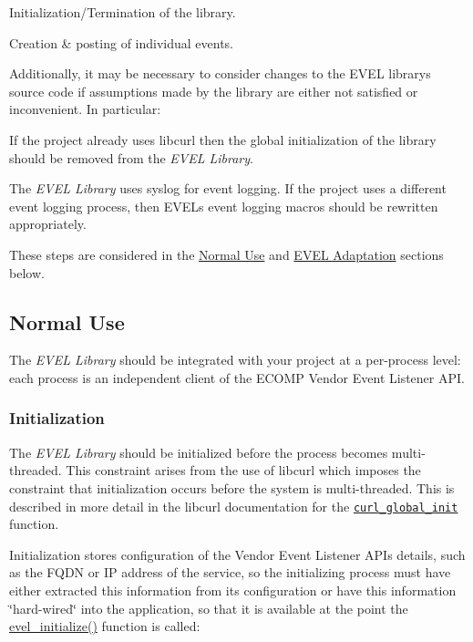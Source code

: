\begin{DoxyItemize}
\item Initialization/\+Termination of the library.
\item Creation \& posting of individual events.
\end{DoxyItemize}

Additionally, it may be necessary to consider changes to the E\+V\+E\+L library\textquotesingle{}s source code if assumptions made by the library are either not satisfied or inconvenient. In particular\+:


\begin{DoxyItemize}
\item If the project already uses libcurl then the global initialization of the library should be removed from the {\itshape E\+V\+E\+L Library}.
\item The {\itshape E\+V\+E\+L Library} uses {\ttfamily syslog} for event logging. If the project uses a different event logging process, then E\+V\+E\+L\textquotesingle{}s event logging macros should be rewritten appropriately.
\end{DoxyItemize}

These steps are considered in the \hyperlink{quickstart_qs_normal_use}{Normal Use} and \hyperlink{quickstart_qs_adaptation}{E\+V\+E\+L Adaptation} sections below.\hypertarget{quickstart_qs_normal_use}{}\subsection{Normal Use}\label{quickstart_qs_normal_use}
The {\itshape E\+V\+E\+L Library} should be integrated with your project at a per-\/process level\+: each process is an independent client of the E\+C\+O\+M\+P Vendor Event Listener A\+P\+I.\hypertarget{quickstart_qs_initialize}{}\subsubsection{Initialization}\label{quickstart_qs_initialize}
The {\itshape E\+V\+E\+L Library} should be initialized before the process becomes multi-\/threaded. This constraint arises from the use of libcurl which imposes the constraint that initialization occurs before the system is multi-\/threaded. This is described in more detail in the libcurl documentation for the \href{https://curl.haxx.se/libcurl/c/curl_global_init.html}{\tt curl\+\_\+global\+\_\+init} function.

Initialization stores configuration of the Vendor Event Listener A\+P\+I\textquotesingle{}s details, such as the F\+Q\+D\+N or I\+P address of the service, so the initializing process must have either extracted this information from its configuration or have this information \char`\"{}hard-\/wired\char`\"{} into the application, so that it is available at the point the {\ttfamily \hyperlink{evel_8c_aff020c5505e724b414ac981e2a23fcd6}{evel\+\_\+initialize()}} function is called\+:


